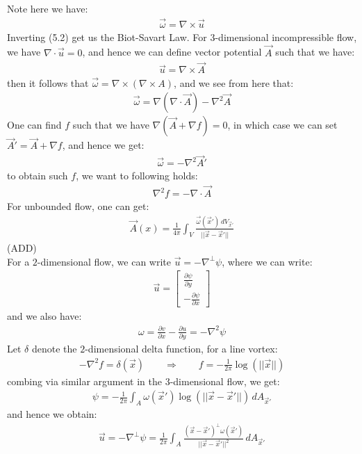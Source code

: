 \documentclass[11pt]{book}
\theoremstyle{break}
\theoremstyle{break}
\newcommand{\pd}{\partial}
\newcommand{\bmat}[1]{\begin{bmatrix} #1 \end{bmatrix}}
\begin{document}
\hfill\break
\hfill\break
Note here we have:
\begin{align}
\vec{\omega} = \nabla \times \vec{u}
\end{align}
Inverting (5.2) get us the Biot-Savart Law. For $3$-dimensional incompressible flow, we have $\nabla \cdot \vec{u}= 0$, and hence we can define vector potential $\vec{A}$ such that we have:
\begin{align*}
\vec{u} = \nabla \times \vec{A}
\end{align*}
then it follows that $\vec{\omega} = \nabla \times( \nabla \times A)$, and we see from here that:
\begin{align*}
\vec{\omega} = \nabla (\nabla \cdot \vec{A}) - \nabla^2 \vec{A}
\end{align*}
One can find $f$ such that we have $\nabla(\vec{A}+ \nabla f) = 0$, in which case we can set $\vec{A}' = \vec{A}+\nabla f$, and hence we get:
\begin{align*}
\vec{\omega} = -\nabla^2 \vec{A}'
\end{align*}
to obtain such $f$, we want to following holds:
\begin{align*}
\nabla^2 f = -\nabla \cdot \vec{A}
\end{align*}
For unbounded flow, one can get:
\begin{align*}
\vec{A}(x) = \frac{1}{4\pi}\int_V \frac{\vec{\omega}(\vec{x}') \, dV_{\vec{x}'}}{||\vec{x} - \vec{x}'||}
\end{align*}
(ADD)\\

For a $2$-dimensional flow, we can write $\vec{u} = -\nabla^{\perp}\psi$, where we can write:
\begin{align*}
\vec{u} = \bmat{\frac{\partial \psi}{\partial y} \\ -\frac{\pd \psi}{\pd x}}
\end{align*}
and we also have:
\begin{align*}
\omega = \frac{\pd v}{\pd x} - \frac{\pd u}{\pd y} = -\nabla^2 \psi
\end{align*}
Let $\delta$ denote the $2$-dimensional delta function, for a line vortex:
\begin{align*}
-\nabla^2 f = \delta(\vec{x}) \qquad \Rightarrow \qquad f = -\frac{1}{2\pi}\log(||\vec{x}||)
\end{align*}
combing via similar argument in the $3$-dimensional flow, we get:
\begin{align}
\psi = -\frac{1}{2\pi}\int_A \omega(\vec{x}') \log\left( ||\vec{x} - \vec{x}'||\right) \, dA_{\vec{x}'}
\end{align}
and hence we obtain:
\begin{align*}
\vec{u} = -\nabla^\perp \psi = \frac{1}{2\pi}\int_A \frac{(\vec{x} - \vec{x}')^{\perp}\omega(\vec{x}')}{||\vec{x} - \vec{x}'||^2}\, dA_{\vec{x}'}
\end{align*}
\end{document}
